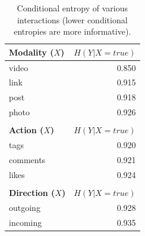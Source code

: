 \begin{table}
\hspace{-10mm}
\centering
{\footnotesize
    	\begin{tabular}{| >{\small}l | >{\small}r | }
	        \hline
	        \textbf{ Modality ($X$)} & $H(Y|X=true)$ \\
	        \hline
	        { video } & 0.850 \\
	        \hline
	        { link } & 0.915 \\
	        \hline
	        { post } & 0.918 \\
	        \hline
	        { photo } & 0.926 \\
	        \hline
		\multicolumn{2}{c}{}\\

	        \hline
	        \textbf{Action ($X$)}  & $H(Y|X=true)$ \\
	        \hline
	        { tags }  &  0.920 \\
	        \hline
	        { comments }  &  0.921 \\
	        \hline
	        { likes }  &  0.924 \\
	        \hline
     
 		     
		\multicolumn{2}{c}{}\\
        \hline
        \textbf{ Direction ($X$) } & $H(Y|X=true)$ \\
        \hline
        { outgoing }  &  0.928 \\
        \hline
        { incoming }  &  0.935 \\
        \hline
		\end{tabular}}
	\caption{Conditional entropy of various interactions (lower conditional
	entropies are more informative).}
	\label{table:ce_interaction}
	\vspace{-2mm}
\end{table}



